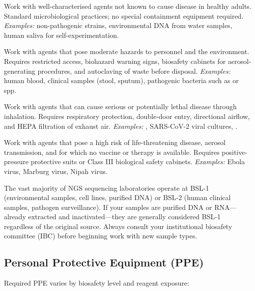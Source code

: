 \begin{description}[style=nextline]
  \item[BSL-1] Work with well-characterised agents not known to cause disease in healthy adults. Standard microbiological practices; no special containment equipment required. \emph{Examples:} non-pathogenic  strains, environmental DNA from water samples, human saliva for self-experimentation.
  \item[BSL-2] Work with agents that pose moderate hazards to personnel and the environment. Requires restricted access, biohazard warning signs, biosafety cabinets for aerosol-generating procedures, and autoclaving of waste before disposal. \emph{Examples:} human blood, clinical samples (stool, sputum), pathogenic bacteria such as  or  spp.
  \item[BSL-3] Work with agents that can cause serious or potentially lethal disease through inhalation. Requires respiratory protection, double-door entry, directional airflow, and HEPA filtration of exhaust air. \emph{Examples:} , SARS-CoV-2 viral cultures, .
  \item[BSL-4] Work with agents that pose a high risk of life-threatening disease, aerosol transmission, and for which no vaccine or therapy is available. Requires positive-pressure protective suits or Class III biological safety cabinets. \emph{Examples:} Ebola virus, Marburg virus, Nipah virus.
\end{description}

\begin{tipbox}[title={Most Sequencing Labs Operate at BSL-1 or BSL-2}]
The vast majority of \acrshort{NGS} sequencing laboratories operate at BSL-1 (environmental samples, cell lines, purified DNA) or BSL-2 (human clinical samples, pathogen surveillance). If your samples are purified DNA or RNA---already extracted and inactivated---they are generally considered BSL-1 regardless of the original source. Always consult your institutional biosafety committee (IBC) before beginning work with new sample types.
\end{tipbox}

\subsection{Personal Protective Equipment (PPE)}
\label{subsec:protocols:ppe}

Required \acrshort{PPE} varies by biosafety level and reagent exposure:

